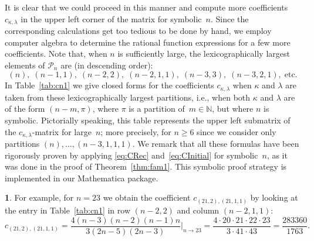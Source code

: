 \documentclass[10pt,oneside,american]{amsart}
\numberwithin{equation}{section}
\numberwithin{figure}{section}
\theoremstyle{plain}
\theoremstyle{definition}
\theoremstyle{remark}
\theoremstyle{plain}
\theoremstyle{definition}
\newtheorem{example}[thm]{\protect\examplename}
\theoremstyle{plain}
\theoremstyle{plain}
\providecommand{\examplename}{Example}
\begin{document}
It is clear that we could proceed in this manner and compute more coefficients
$c_{\kappa,\lambda}$ in the upper left corner of the matrix for symbolic~$n$.
Since the corresponding calculations get too tedious to be done by hand, we
employ computer algebra to determine the rational function expressions for a
few more coefficients.  Note that, when $n$ is sufficiently large, the
lexicographically largest elements of $\mathcal{P}_n$ are (in descending
order): %
\[
  (n), \; (n-1,1), \; (n-2,2), \; (n-2,1,1), \; (n-3,3), \; (n-3,2,1), \; \text{etc.}
\]
In Table~\ref{tab:cn1} we give closed forms for the coefficients
$c_{\kappa,\lambda}$ when $\kappa$ and $\lambda$ are taken from these
lexicographically largest partitions, i.e., when both $\kappa$ and $\lambda$
are of the form $(n-m,\pi)$, where $\pi$ is a partition of~$m\in\mathbb{N}$,
but where $n$ is symbolic.  Pictorially speaking, this table represents the
upper left submatrix of the $c_{\kappa,\lambda}$-matrix for large~$n$; more
precisely, for $n\geq6$ since we consider only partitions
$(n),\dots,(n-3,1,1,1)$. We remark that all these formulas have been
rigorously proven by applying \eqref{eq:CRec} and~\eqref{eq:CInitial} for
symbolic~$n$, as it was done in the proof of Theorem~\ref{thm:fam1}. This
symbolic proof strategy is implemented in our Mathematica package.
\begin{example}
For example, for $n=23$ we obtain the coefficient $c_{(21,2),(21,1,1)}$ by
looking at the entry in Table~\ref{tab:cn1} in row $(n-2,2)$ and column
$(n-2,1,1)$:
\[
  c_{(21,2),(21,1,1)} = \frac{4 (n-3) (n-2) (n-1) n}{3 (2 n-5) (2 n-3)} \Big|_{n\to23}
  = \frac{4 \cdot 20 \cdot 21 \cdot 22 \cdot 23}{3 \cdot 41 \cdot 43}
  = \frac{283360}{1763}.
\]
\end{example}
\end{document}
